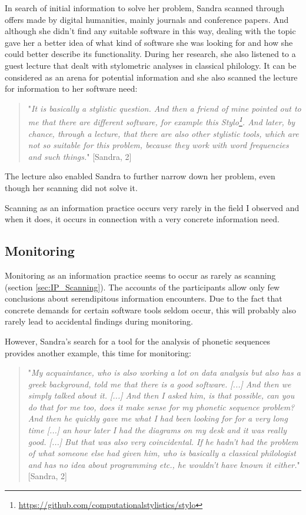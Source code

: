 \documentclass[12pt, a4paper, titlepage, oneside, abstract=true, toc=listof, toc=bibliography, BCOR=1cm]{scrreprt}
\begin{document}
{In search of initial information to solve her problem, Sandra scanned through offers made by digital humanities, mainly journals and conference papers. And although she didn't find any suitable software in this way, dealing with the topic gave her a better idea of what kind of software she was looking for and how she could better describe its functionality. During her research, she also listened to a guest lecture that dealt with stylometric analyses in classical philology. It can be considered as an arena for potential information and she also scanned the lecture for information to her software need:

\begin{quotation}
"\textit{It is basically a stylistic question. And then a friend of mine pointed out to me that there are different software, for example this Stylo\footnote{\url{https://github.com/computationalstylistics/stylo}}. And later, by chance, through a lecture, that there are also other stylistic tools, which are not so suitable for this problem, because they work with word frequencies and such things.}" [Sandra, 2]
\end{quotation}

The lecture also enabled Sandra to further narrow down her problem, even though her scanning did not solve it.

Scanning as an information practice occurs very rarely in the field I observed and when it does, it occurs in connection with a very concrete information need. 

\subsection{Monitoring}
\label{sec:IP_Monitoring}
Monitoring as an information practice seems to occur as rarely as scanning (section \ref{sec:IP_Scanning}). The accounts of the participants allow only few conclusions about serendipitous information encounters. Due to the fact that concrete demands for certain software tools seldom occur, this will probably also rarely lead to accidental findings during monitoring. 

However, Sandra's search for a tool for the analysis of phonetic sequences provides another example, this time for monitoring:

\begin{quotation}
"\textit{My acquaintance, who is also working a lot on data analysis but also has a greek background, told me that there is a good software. [...] And then we simply talked about it. [...] And then I asked him, is that possible, can you do that for me too, does it make sense for my phonetic sequence problem? And then he quickly gave me what I had been looking for for a very long time [...] an hour later I had the diagrams on my desk and it was really good. [...] But that was also very coincidental. If he hadn't had the problem of what someone else had given him, who is basically a classical philologist and has no idea about programming etc., he wouldn't have known it either.}" [Sandra, 2]
\end{quotation}

}
\end{document}
